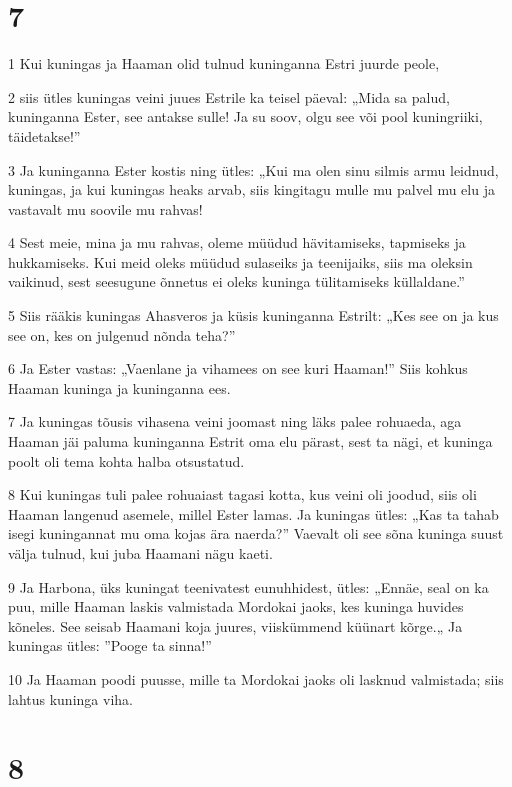 \chapter{7}

\par 1 Kui kuningas ja Haaman olid tulnud kuninganna Estri juurde peole,
\par 2 siis ütles kuningas veini juues Estrile ka teisel päeval: „Mida sa palud, kuninganna Ester, see antakse sulle! Ja su soov, olgu see või pool kuningriiki, täidetakse!”
\par 3 Ja kuninganna Ester kostis ning ütles: „Kui ma olen sinu silmis armu leidnud, kuningas, ja kui kuningas heaks arvab, siis kingitagu mulle mu palvel mu elu ja vastavalt mu soovile mu rahvas!
\par 4 Sest meie, mina ja mu rahvas, oleme müüdud hävitamiseks, tapmiseks ja hukkamiseks. Kui meid oleks müüdud sulaseiks ja teenijaiks, siis ma oleksin vaikinud, sest seesugune õnnetus ei oleks kuninga tülitamiseks küllaldane.”
\par 5 Siis rääkis kuningas Ahasveros ja küsis kuninganna Estrilt: „Kes see on ja kus see on, kes on julgenud nõnda teha?”
\par 6 Ja Ester vastas: „Vaenlane ja vihamees on see kuri Haaman!” Siis kohkus Haaman kuninga ja kuninganna ees.
\par 7 Ja kuningas tõusis vihasena veini joomast ning läks palee rohuaeda, aga Haaman jäi paluma kuninganna Estrit oma elu pärast, sest ta nägi, et kuninga poolt oli tema kohta halba otsustatud.
\par 8 Kui kuningas tuli palee rohuaiast tagasi kotta, kus veini oli joodud, siis oli Haaman langenud asemele, millel Ester lamas. Ja kuningas ütles: „Kas ta tahab isegi kuningannat mu oma kojas ära naerda?” Vaevalt oli see sõna kuninga suust välja tulnud, kui juba Haamani nägu kaeti.
\par 9 Ja Harbona, üks kuningat teenivatest eunuhhidest, ütles: „Ennäe, seal on ka puu, mille Haaman laskis valmistada Mordokai jaoks, kes kuninga huvides kõneles. See seisab Haamani koja juures, viiskümmend küünart kõrge.„ Ja kuningas ütles: ”Pooge ta sinna!”
\par 10 Ja Haaman poodi puusse, mille ta Mordokai jaoks oli lasknud valmistada; siis lahtus kuninga viha.

\chapter{8}

